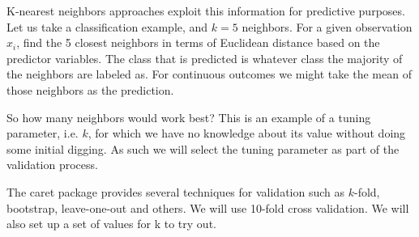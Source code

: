 \documentclass[english,nohyper,titlepage]{tufte-handout}\usepackage{knitr}
\begin{document}
K-nearest neighbors approaches exploit this information for predictive purposes.  Let us take a classification example, and $k = 5$ neighbors.  For a given observation $x_i$, find the 5 closest neighbors in terms of Euclidean distance based on the predictor variables.  The class that is predicted is whatever class the majority of the neighbors are labeled as.  For continuous outcomes we might take the mean of those neighbors as the prediction.

So how many neighbors would work best? This is an example of a tuning parameter, i.e. $k$, for which we have no knowledge about its value without doing some initial digging.  As such we will select the tuning parameter as part of the validation process.

The caret package provides several techniques for validation such as $k$-fold, bootstrap, leave-one-out and others.  We will use 10-fold cross validation.  We will also set up a set of values for k to try out.
\end{document}
